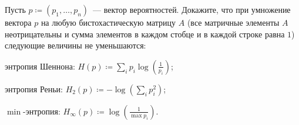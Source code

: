 Пусть $p \coloneqq (p_1, \dots, p_n)$~--- вектор вероятностей. Докажите, что при умножение вектора $p$ на
любую бистохастическую матрицу $A$ (все матричные элементы $A$ неотрицательны и сумма элементов в каждом
стобце и в каждой строке равна $1$) следующие величины не уменьшаются:
\begin{enumcyr}
    \item энтропия Шеннона: $H(p) \coloneqq \sum\limits_{i} p_i \log\left(\frac{1}{p_i}\right)$;
	\item энтропия Реньи: $H_2(p) \coloneqq -\log(\sum\limits_{i} p_i^2)$;
    \item $\min$-энтропия: $H_{\infty}(p) \coloneqq \log\left(\frac{1}{\max p_i}\right)$.
\end{enumcyr}
